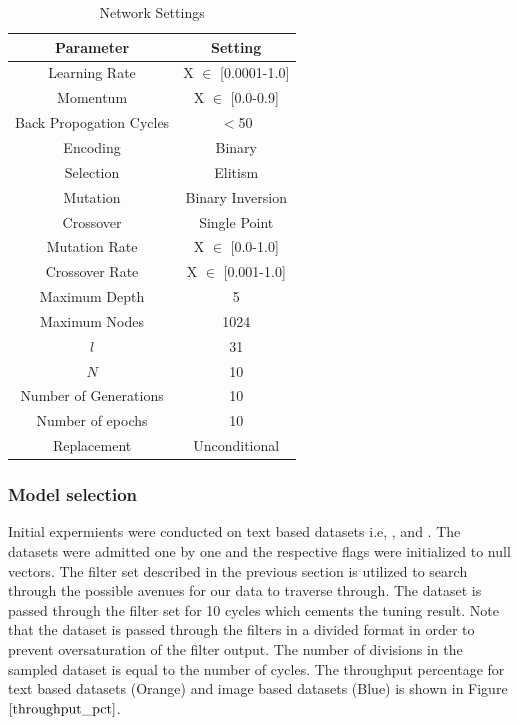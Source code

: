 \documentclass[conference]{IEEEtran}
\begin{document}
\begin{table}[htbp]
\caption{Network Settings}
\begin{center}
\begin{tabular}{ c  c }
\hline
\textbf{Parameter}&\textbf{Setting}\\
\hline
\hline
{Learning Rate}&{X $\in$ [0.0001-1.0]}\\
\hline
{Momentum}&{X $\in$ [0.0-0.9]}\\
\hline
{Back Propogation Cycles}&{$<$50}\\
\hline
{Encoding}&{Binary}\\
\hline
{Selection}&{Elitism}\\
\hline
{Mutation}&{Binary Inversion}\\
\hline
{Crossover}&{Single Point}\\
\hline
{Mutation Rate}&{X $\in$ [0.0-1.0]}\\
\hline
{Crossover Rate}&{X $\in$ [0.001-1.0]}\\
\hline
{Maximum Depth}&{5}\\
\hline
{Maximum Nodes}&{1024}\\
\hline
{$l$}&{31}\\
\hline
{$N$}&{10}\\
\hline
{Number of Generations}&{10}\\
\hline
{Number of epochs}&{10}\\
\hline
{Replacement}&{Unconditional}\\
\hline
\end{tabular}
\label{tab1}
\end{center}
\end{table}


\subsubsection{Model selection}

Initial expermients were conducted on text based datasets i.e, \cite{IMDB}, \cite{reuters} and \cite{boston}. The datasets were admitted one by one and the respective flags were initialized to null vectors. The filter set described in the previous section is utilized to search through the possible avenues for our data to traverse through. The dataset is passed through the filter set for 10 cycles which cements the tuning result. Note that the dataset is passed through the filters in a divided format in order to prevent oversaturation of the filter output. The number of divisions in the sampled dataset is equal to the number of cycles. The throughput percentage for text based datasets (Orange) and image based datasets (Blue) is shown in Figure $\ref{throughput_pct}$. 
\end{document}
